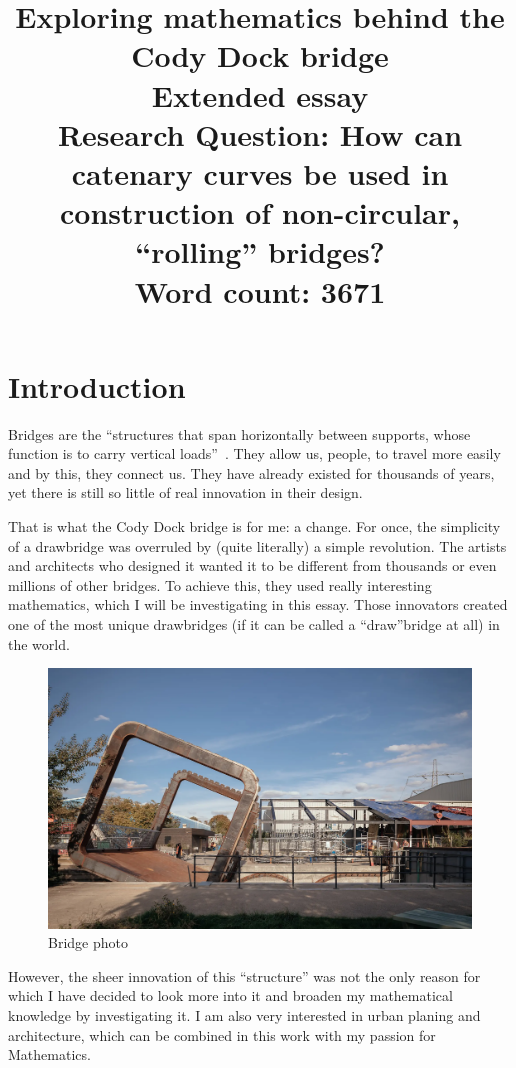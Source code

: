 \documentclass[12pt]{article}
\title{Exploring mathematics behind the Cody Dock bridge \\
    \large Extended essay \\
    \normalsize Research Question: How can catenary curves be used in construction of non-circular, ``rolling'' bridges? \\
    \vspace{12pt} Word count: 3671}
\date{}
\author{}
\begin{document}
    \maketitle
    \newpage
    \tableofcontents
    \newpage
    
    \section{Introduction}

        Bridges are the ``structures that span horizontally between supports, whose function is to carry vertical loads''~\cite{bridge_encyplopedia}. They allow us, people, to travel more easily and by this, they connect us. They have already existed for thousands of years, yet there is still so little of real innovation in their design.
    
        That is what the Cody Dock bridge is for me: a change. For once, the simplicity of a drawbridge was overruled by (quite literally) a simple revolution. The artists and architects who designed it wanted it to be different from thousands or even millions of other bridges. To achieve this, they used really interesting mathematics, which I will be investigating in this essay. Those innovators created one of the most unique drawbridges (if it can be called a ``draw''bridge at all) in the world.

        \begin{figure}[H]
            \centering
            \includegraphics[width=0.75\linewidth]{images/bridge.png}
            \caption[Bridge photo]{Bridge photo~\cite{bridge_photos}}\label{fig:bridge_photo}
        \end{figure}

        However, the sheer innovation of this ``structure'' was not the only reason for which I have decided to look more into it and broaden my mathematical knowledge by investigating it. I am also very interested in urban planing and architecture, which can be combined in this work with my passion for Mathematics.
\end{document}
